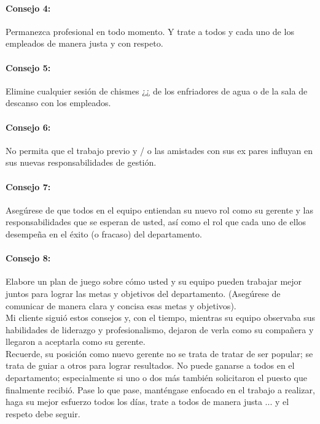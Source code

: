 \documentclass[10pt]{book}
\begin{document}
\paragraph{Consejo 4:} Permanezca profesional en todo momento. Y trate a todos y cada uno de los empleados de manera justa y con respeto.
\paragraph{Consejo 5:} Elimine cualquier sesión de chismes ¿¿ de los enfriadores de agua o de la sala de descanso con los empleados.
\paragraph{Consejo 6:} No permita que el trabajo previo y / o las amistades con sus ex pares influyan en sus nuevas responsabilidades de gestión.
\paragraph{Consejo 7:} Asegúrese de que todos en el equipo entiendan su nuevo rol como su gerente y las responsabilidades que se esperan de usted, así como el rol que cada uno de ellos desempeña en el éxito (o fracaso) del departamento.
\paragraph{Consejo 8:} Elabore un plan de juego sobre cómo usted y su equipo pueden trabajar mejor juntos para lograr las metas y objetivos del departamento. (Asegúrese de comunicar de manera clara y concisa esas metas y objetivos).\\
Mi cliente siguió estos consejos y, con el tiempo, mientras su equipo observaba sus habilidades de liderazgo y profesionalismo, dejaron de verla como su compañera y llegaron a aceptarla como su gerente.\\
Recuerde, su posición como nuevo gerente no se trata de tratar de ser popular; se trata de guiar a otros para lograr resultados. No puede ganarse a todos en el departamento; especialmente si uno o dos más también solicitaron el puesto que finalmente recibió. Pase lo que pase, manténgase enfocado en el trabajo a realizar, haga su mejor esfuerzo todos los días, trate a todos de manera justa ... y el respeto debe seguir.
\end{document}
